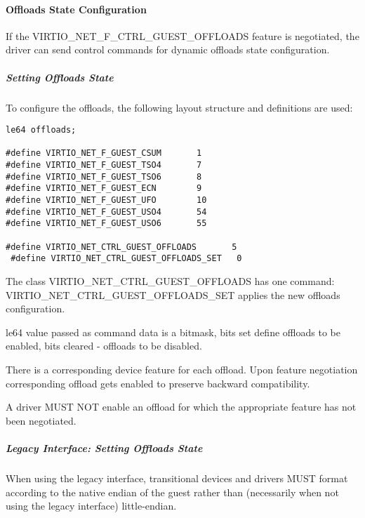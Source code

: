 \paragraph{Offloads State Configuration}\label{sec:Device Types / Network Device / Device Operation / Control Virtqueue / Offloads State Configuration}

If the VIRTIO_NET_F_CTRL_GUEST_OFFLOADS feature is negotiated, the driver can
send control commands for dynamic offloads state configuration.

\subparagraph{Setting Offloads State}\label{sec:Device Types / Network Device / Device Operation / Control Virtqueue / Offloads State Configuration / Setting Offloads State}

To configure the offloads, the following layout structure and
definitions are used:

\begin{lstlisting}
le64 offloads;

#define VIRTIO_NET_F_GUEST_CSUM       1
#define VIRTIO_NET_F_GUEST_TSO4       7
#define VIRTIO_NET_F_GUEST_TSO6       8
#define VIRTIO_NET_F_GUEST_ECN        9
#define VIRTIO_NET_F_GUEST_UFO        10
#define VIRTIO_NET_F_GUEST_USO4       54
#define VIRTIO_NET_F_GUEST_USO6       55

#define VIRTIO_NET_CTRL_GUEST_OFFLOADS       5
 #define VIRTIO_NET_CTRL_GUEST_OFFLOADS_SET   0
\end{lstlisting}

The class VIRTIO_NET_CTRL_GUEST_OFFLOADS has one command:
VIRTIO_NET_CTRL_GUEST_OFFLOADS_SET applies the new offloads configuration.

le64 value passed as command data is a bitmask, bits set define
offloads to be enabled, bits cleared - offloads to be disabled.

There is a corresponding device feature for each offload. Upon feature
negotiation corresponding offload gets enabled to preserve backward
compatibility.


A driver MUST NOT enable an offload for which the appropriate feature
has not been negotiated.

\subparagraph{Legacy Interface: Setting Offloads State}\label{sec:Device Types / Network Device / Device Operation / Control Virtqueue / Offloads State Configuration / Setting Offloads State / Legacy Interface: Setting Offloads State}
When using the legacy interface, transitional devices and drivers
MUST format 
according to the native endian of the guest rather than
(necessarily when not using the legacy interface) little-endian.


